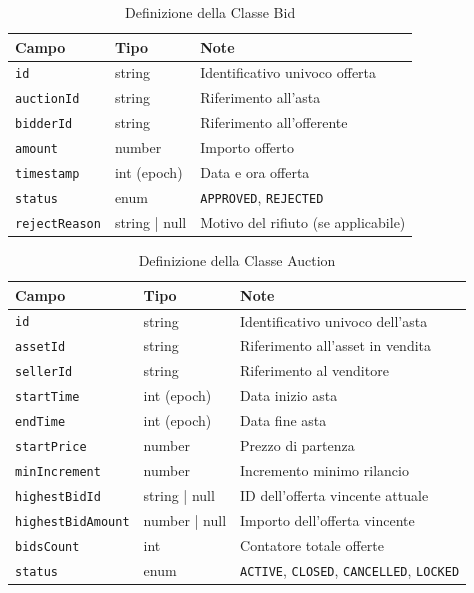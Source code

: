 \begin{table}[h!]
    \centering
    \begin{tabular}{@{}llp{6cm}@{}}
        \toprule
        \textbf{Campo} & \textbf{Tipo} & \textbf{Note} \\
        \midrule
        \texttt{id} & string & Identificativo univoco offerta \\
        \texttt{auctionId} & string & Riferimento all'asta \\
        \texttt{bidderId} & string & Riferimento all'offerente \\
        \texttt{amount} & number & Importo offerto \\
        \texttt{timestamp} & int (epoch) & Data e ora offerta \\
        \texttt{status} & enum & \texttt{APPROVED}, \texttt{REJECTED} \\
        \texttt{rejectReason} & string | null & Motivo del rifiuto (se applicabile) \\
        \bottomrule
    \end{tabular}
    \caption{Definizione della Classe Bid}
\end{table}

\begin{table}[h!]
    \centering
    \begin{tabular}{@{}llp{6cm}@{}}
        \toprule
        \textbf{Campo} & \textbf{Tipo} & \textbf{Note} \\
        \midrule
        \texttt{id} & string & Identificativo univoco dell'asta \\
        \texttt{assetId} & string & Riferimento all'asset in vendita \\
        \texttt{sellerId} & string & Riferimento al venditore \\
        \texttt{startTime} & int (epoch) & Data inizio asta \\
        \texttt{endTime} & int (epoch) & Data fine asta \\
        \texttt{startPrice} & number & Prezzo di partenza \\
        \texttt{minIncrement} & number & Incremento minimo rilancio \\
        \texttt{highestBidId} & string | null & ID dell'offerta vincente attuale \\
        \texttt{highestBidAmount} & number | null & Importo dell'offerta vincente \\
        \texttt{bidsCount} & int & Contatore totale offerte \\
        \texttt{status} & enum & \texttt{ACTIVE}, \texttt{CLOSED}, \texttt{CANCELLED}, \texttt{LOCKED} \\
        \bottomrule
    \end{tabular}
    \caption{Definizione della Classe Auction}
\end{table}

